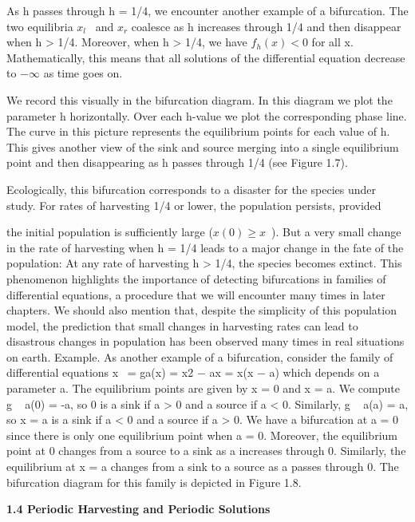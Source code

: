 \documentclass{article}
\begin{document}
As h passes through h = 1/4, we encounter another example of a bifurcation.
The two equilibria $x_l$  and $x_r$ coalesce as h increases through 1/4 and then
disappear when h > 1/4. Moreover, when h > 1/4, we have $f_h(x) < 0$ for all
x. Mathematically, this means that all solutions of the differential equation
decrease to $-\infty$ as time goes on.


We record this visually in the bifurcation diagram. In this diagram we plot
the parameter h horizontally. Over each h-value we plot the corresponding
phase line. The curve in this picture represents the equilibrium points for each
value of h. This gives another view of the sink and source merging into a
single equilibrium point and then disappearing as h passes through 1/4 (see
Figure 1.7).


Ecologically, this bifurcation corresponds to a disaster for the species under
study. For rates of harvesting 1/4 or lower, the population persists, provided

the initial population is sufficiently large ($x(0) \geq x$ ). But a very small change
in the rate of harvesting when h = 1/4 leads to a major change in the fate of
the population: At any rate of harvesting h > 1/4, the species becomes extinct.
This phenomenon highlights the importance of detecting bifurcations in
families of differential equations, a procedure that we will encounter many
times in later chapters. We should also mention that, despite the simplicity of
this population model, the prediction that small changes in harvesting rates
can lead to disastrous changes in population has been observed many times in
real situations on earth.
Example. As another example of a bifurcation, consider the family of
differential equations
x  = ga(x) = x2 − ax = x(x − a)
which depends on a parameter a. The equilibrium points are given by x = 0
and x = a. We compute g  
a(0) = -a, so 0 is a sink if a > 0 and a source if
a < 0. Similarly, g  
a(a) = a, so x = a is a sink if a < 0 and a source if a > 0.
We have a bifurcation at a = 0 since there is only one equilibrium point when
a = 0. Moreover, the equilibrium point at 0 changes from a source to a sink
as a increases through 0. Similarly, the equilibrium at x = a changes from a
sink to a source as a passes through 0. The bifurcation diagram for this family
is depicted in Figure 1.8.  

\hfill

\textbf{1.4 Periodic Harvesting and
Periodic Solutions}

\hfill
\end{document}
